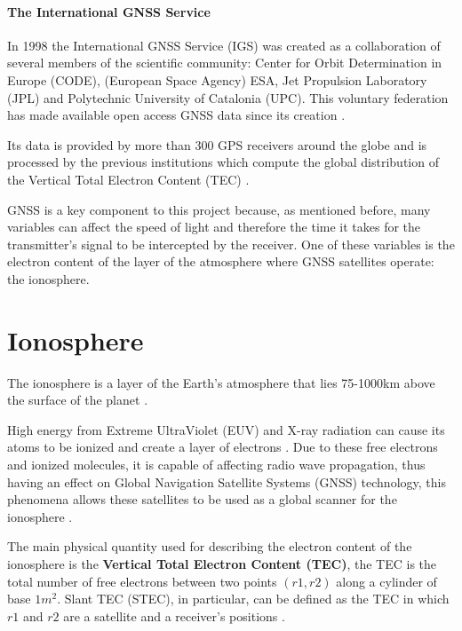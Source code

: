\paragraph{The International GNSS Service}

In 1998 the International GNSS Service (IGS) was created as a collaboration of several members of the scientific community: Center for Orbit Determination in Europe (CODE), (European Space Agency) ESA, Jet Propulsion Laboratory (JPL) and Polytechnic University of Catalonia (UPC). This voluntary federation has made available open access GNSS data since its creation \cite{igswebsite} \cite{dow2009international}. 

Its data is provided by more than 300 GPS receivers around the globe and is processed by the previous institutions which compute the global distribution of the Vertical Total Electron Content (TEC) \cite{hernandez2009igs}.

GNSS is a key component to this project because, as mentioned before, many variables can affect the speed of light and therefore the time it takes for the transmitter's signal to be intercepted by the receiver. One of these variables is the electron content of the layer of the atmosphere where GNSS satellites operate: the ionosphere.

\section{Ionosphere}

The ionosphere is a layer of the Earth’s atmosphere that lies 75-1000km above the surface of the planet \cite{ionospherestandford}. 

High energy from Extreme UltraViolet (EUV) and X-ray radiation can cause its atoms to be ionized and create a layer of electrons \cite{noaa2ionosphere}. Due to these free electrons and ionized molecules, it is capable of affecting radio wave propagation, thus having an effect on Global Navigation Satellite Systems (GNSS) technology, this phenomena allows these satellites to be used as a global scanner for the ionosphere \cite{hernandez2011ionosphere}. 

The main physical quantity used for describing the electron content of the ionosphere is the \textbf{Vertical Total Electron Content (TEC)}, the TEC is the total number of free electrons between two points $(r1,r2)$ along a cylinder of base $1m^2$. 
Slant TEC (STEC), in particular, can be defined as the TEC in which $r1$ and $r2$ are a satellite and a receiver’s positions \cite{singh2015gps}. 

